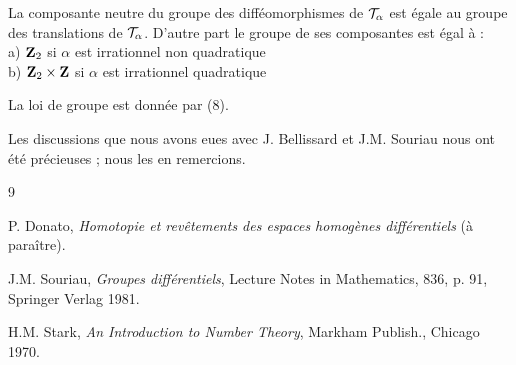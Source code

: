 \documentclass[10pt]{amsart}
\renewcommand{\Torus}{\cT}
\begin{document}
  \begin{theoreme}
    La composante neutre du groupe des difféomorphismes de $\Torus_{\alpha}$ est égale au groupe des translations de $\Torus_{\alpha}$.
    D'autre part le groupe de ses composantes est égal à : \\
    a) ${\mathbf{Z}}_{2}$ si $\alpha$ est irrationnel non quadratique \\
    b) ${\mathbf{Z}}_{2} \times {\mathbf{Z}}$ si $\alpha$ est irrationnel quadratique
  \end{theoreme}
  La loi de groupe est donnée par (8).
  
  \vspace{1cm}
  Les discussions que nous avons eues avec J. Bellissard et J.M. Souriau nous ont été précieuses ;
  nous les en remercions.
  
  
  \begin{thebibliography}{9}
    
    P. Donato,
    \textit{Homotopie et revêtements des espaces homogènes différentiels} (à paraître).
    
    J.M. Souriau,
    \textit{Groupes différentiels}, Lecture Notes in Mathematics, 836, p. 91, Springer Verlag 1981.
    
    H.M. Stark,
    \textit{An Introduction to Number Theory}, Markham Publish., Chicago 1970.
    
  \end{thebibliography}
  
  
\end{document}
